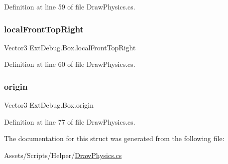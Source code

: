 Definition at line 59 of file Draw\+Physics.\+cs.

\mbox{\label{struct_ext_debug_1_1_box_a2770f1b4de3e37e1a1af7a32a465098c}} 
\subsubsection{\texorpdfstring{local\+Front\+Top\+Right}{localFrontTopRight}}
{\footnotesize\ttfamily Vector3 Ext\+Debug.\+Box.\+local\+Front\+Top\+Right\hspace{0.3cm}{\ttfamily [get]}}



Definition at line 60 of file Draw\+Physics.\+cs.

\mbox{\label{struct_ext_debug_1_1_box_a51a1f8d9daa4658d72f41d37adf23e82}} 
\subsubsection{\texorpdfstring{origin}{origin}}
{\footnotesize\ttfamily Vector3 Ext\+Debug.\+Box.\+origin\hspace{0.3cm}{\ttfamily [get]}}



Definition at line 77 of file Draw\+Physics.\+cs.



The documentation for this struct was generated from the following file\+:\begin{DoxyCompactItemize}
\item 
Assets/\+Scripts/\+Helper/\mbox{\hyperlink{_draw_physics_8cs}{Draw\+Physics.\+cs}}\end{DoxyCompactItemize}
